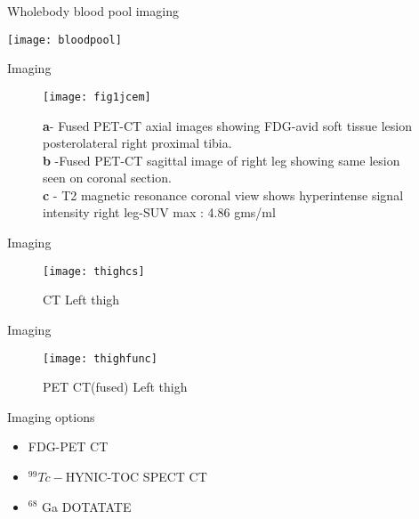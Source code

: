 \begin{frame} {Wholebody blood pool imaging}
\begin{center}
	\texttt{[image: bloodpool]}
\end{center}
\end{frame}
\begin{frame}{Imaging}
	\begin{figure}
		\texttt{[image: fig1jcem]}
       \scriptsize \caption{\textbf{a}- Fused PET-CT axial images showing FDG-avid soft tissue lesion posterolateral right proximal tibia.\\ \textbf{ b} -Fused PET-CT sagittal image of right leg showing same lesion seen on coronal section.\\ \textbf{ c} - T2 magnetic resonance coronal view shows hyperintense signal intensity right leg-SUV max : 4.86 gms/ml}
\end{figure}
\end{frame}
\begin{frame}{Imaging}
\begin{center}
\begin{figure}
	\texttt{[image: thighcs]}
    \caption{CT Left thigh}
\end{figure}	
\end{center}
\end{frame}
\begin{frame}{Imaging}
\begin{center}
\begin{figure}
	\texttt{[image: thighfunc]}
    \caption{PET CT(fused) Left thigh}
\end{figure}	
\end{center}
\end{frame}
\begin{frame}{ Imaging options  }
	\begin{itemize}
		\item FDG-PET CT
		\item $ ^{99}Tc- $HYNIC-TOC SPECT CT
		\item $ ^{68} $ Ga DOTATATE 
	\end{itemize}
\end{frame}
